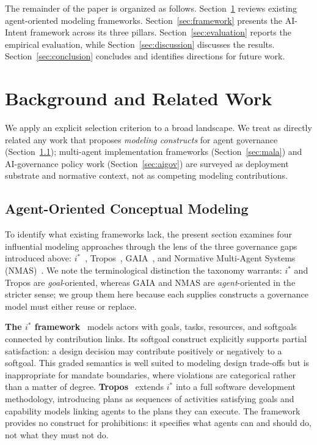 \documentclass[runningheads]{llncs}
\begin{document}
The remainder of the paper is organized as follows. Section~\ref{sec:background}
reviews existing agent-oriented modeling frameworks. Section~\ref{sec:framework}
presents the AI-Intent framework across its three pillars. Section~\ref{sec:evaluation}
reports the empirical evaluation, while Section~\ref{sec:discussion}
discusses the results. Section~\ref{sec:conclusion} concludes and
identifies directions for future work.

\section{Background and Related Work}
\label{sec:background}

We apply an explicit selection criterion to a broad landscape. We treat
as directly related any work that proposes \emph{modeling constructs} for
agent governance (Section~\ref{sec:aomodeling}); multi-agent
implementation frameworks (Section~\ref{sec:mala}) and AI-governance
policy work (Section~\ref{sec:aigov}) are surveyed as deployment substrate
and normative context, not as competing modeling contributions.

\subsection{Agent-Oriented Conceptual Modeling}
\label{sec:aomodeling}

To identify what existing frameworks lack, the present section examines
four influential modeling approaches through the lens of the three
governance gaps introduced above: $i^*$~\cite{yu2011social},
Tropos~\cite{bresciani2004tropos}, GAIA~\cite{wooldridge2000gaia}, and
Normative Multi-Agent Systems (NMAS)~\cite{boella2006introduction}. We
note the terminological distinction the taxonomy warrants: $i^*$ and
Tropos are \emph{goal}-oriented, whereas GAIA and NMAS are
\emph{agent}-oriented in the stricter sense; we group them here because
each supplies constructs a governance model must either reuse or replace.

\textbf{The $i^*$ framework}~\cite{yu2011social} models actors with
goals, tasks, resources, and softgoals connected by contribution links.
Its softgoal construct explicitly supports partial satisfaction: a design
decision may contribute positively or negatively to a softgoal. This
graded semantics is well suited to modeling design trade-offs but is
inappropriate for mandate boundaries, where violations are categorical
rather than a matter of degree.
\textbf{Tropos}~\cite{bresciani2004tropos} extends $i^*$ into a full
software development methodology, introducing plans as sequences of
activities satisfying goals and capability models linking agents to the
plans they can execute. The framework provides no construct for
prohibitions: it specifies what agents can and should do, not what they
must not do.
\end{document}
